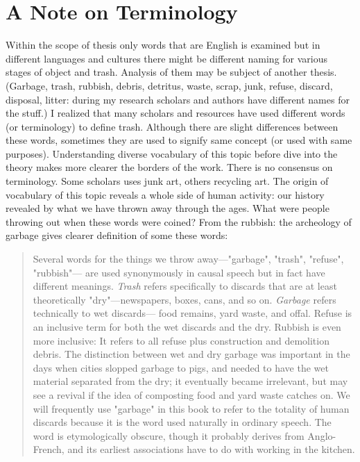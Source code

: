 
\section{A Note on Terminology}
Within the scope of thesis only words that are English is examined but in different languages and cultures there might be different naming for various stages of object and trash. Analysis of them may be subject of another thesis. (Garbage, trash, rubbish, debris, detritus, waste, scrap, junk, refuse, discard, disposal, litter: during my research scholars and authors have different names for the stuff.) I realized that many scholars and resources have used different words (or terminology) to define trash. Although there are slight differences between these words, sometimes they are used to signify same concept (or used with same purposes). Understanding diverse vocabulary of this topic before dive into the theory makes more clearer the borders of the work. There is no consensus on terminology. Some scholars uses junk art, others recycling art. The origin of vocabulary of this topic reveals a whole side of human activity: our history revealed by what we have thrown away through the ages. What were people throwing out when these words were coined? From the rubbish: the archeology of garbage gives clearer definition of some these words:

\begin{quote}
Several words for the things we throw away---"garbage", "trash", "refuse", "rubbish"--- are used synonymously in causal speech but in fact have different meanings. \textit{Trash} refers specifically to discards that are at least theoretically "dry"---newspapers, boxes, cans, and so on. \textit{Garbage} refers technically to wet discards--- food remains, yard waste, and offal. Refuse is an inclusive term for both the wet discards and the dry. Rubbish is even more inclusive: It refers to all refuse plus construction and demolition debris. The distinction between wet and dry garbage was important in the days when cities slopped garbage to pigs, and needed to have the wet material separated from the dry; it eventually became irrelevant, but may see a revival if the idea of composting food and yard waste catches on. We will frequently use "garbage" in this book to refer to the totality of human discards because it is the word used naturally in ordinary speech. The word is etymologically obscure, though it probably derives from Anglo-French, and its earliest associations have to do with working in the kitchen.
\end{quote}

